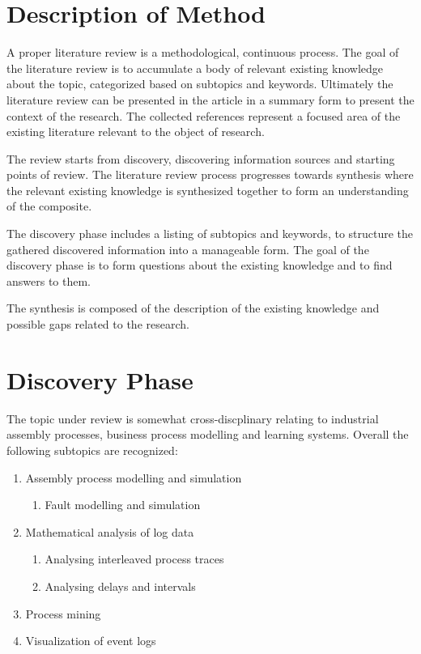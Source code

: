 \documentclass[a4paper,10pt]{article}
\begin{document}
\section{Description of Method}

A proper literature review is a methodological, continuous process. The goal of the literature review is to accumulate a body of relevant existing knowledge
about the topic, categorized based on subtopics and keywords.
Ultimately the literature review can be presented in the article in a summary form to present the context of the research.
The collected references represent a focused area of the existing literature relevant to the object of research.

The review starts from discovery, discovering information sources and starting points of review. The literature review process progresses towards synthesis
where the relevant existing knowledge is synthesized together to form an understanding of the composite.

The discovery phase includes a listing of subtopics and keywords, to structure the gathered discovered information into a manageable form. The goal
of the discovery phase is to form questions about the existing knowledge and to find answers to them.

The synthesis is composed of the description of the existing knowledge and possible gaps related to the research.

\section{Discovery Phase}

The topic under review is somewhat cross-discplinary relating to industrial assembly processes, business process modelling and learning systems.
Overall the following subtopics are recognized:
\begin{enumerate}
 \item Assembly process modelling and simulation
   \begin{enumerate}
     \item Fault modelling and simulation
   \end{enumerate}
 \item Mathematical analysis of log data
   \begin{enumerate}
     \item Analysing interleaved process traces
     \item Analysing delays and intervals
   \end{enumerate}
 \item Process mining
 \item Visualization of event logs
\end{enumerate}
\end{document}
